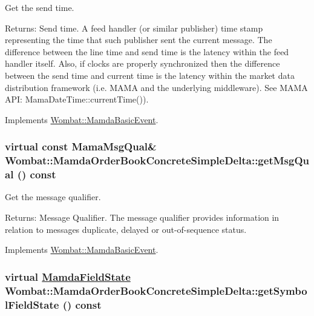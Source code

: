 Get the send time. 

\begin{Desc}
\item[Returns:]Send time. A feed handler (or similar publisher) time stamp representing the time that such publisher sent the current message. The difference between the line time and send time is the latency within the feed handler itself. Also, if clocks are properly synchronized then the difference between the send time and current time is the latency within the market data distribution framework (i.e. MAMA and the underlying middleware). See MAMA API: Mama\-Date\-Time::current\-Time()). \end{Desc}


Implements \hyperlink{classWombat_1_1MamdaBasicEvent_b0602a83bec20cd8b341ec866ff3bffa}{Wombat::Mamda\-Basic\-Event}.\hypertarget{classWombat_1_1MamdaOrderBookConcreteSimpleDelta_32a356426ef7b0ddf847983f13f30f94}{
\subsubsection[getMsgQual]{\setlength{\rightskip}{0pt plus 5cm}virtual const Mama\-Msg\-Qual\& Wombat::Mamda\-Order\-Book\-Concrete\-Simple\-Delta::get\-Msg\-Qual () const}}
\label{classWombat_1_1MamdaOrderBookConcreteSimpleDelta_32a356426ef7b0ddf847983f13f30f94}


Get the message qualifier. 

\begin{Desc}
\item[Returns:]Message Qualifier. The message qualifier provides information in relation to messages duplicate, delayed or out-of-sequence status. \end{Desc}


Implements \hyperlink{classWombat_1_1MamdaBasicEvent_675ce8f1de581548426335423d6b3864}{Wombat::Mamda\-Basic\-Event}.\hypertarget{classWombat_1_1MamdaOrderBookConcreteSimpleDelta_0bad5acee355acc180354fc1029ebca4}{
\subsubsection[getSymbolFieldState]{\setlength{\rightskip}{0pt plus 5cm}virtual \hyperlink{namespaceWombat_93aac974f2ab713554fd12a1fa3b7d2a}{Mamda\-Field\-State} Wombat::Mamda\-Order\-Book\-Concrete\-Simple\-Delta::get\-Symbol\-Field\-State () const}}
\label{classWombat_1_1MamdaOrderBookConcreteSimpleDelta_0bad5acee355acc180354fc1029ebca4}


